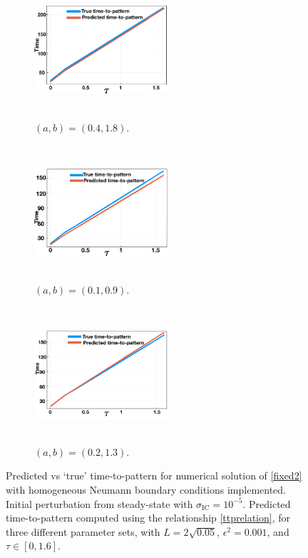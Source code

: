 \begin{figure}[H]
    \centering
    \begin{subfigure}[b]{0.32\textwidth}
        \centering
        \includegraphics[width=5cm,height=5cm]{ttp1.png}
        \caption{$(a,b)=(0.4,1.8)$.}
        \label{fig:ttp1}
    \end{subfigure}
    \hfill
    \begin{subfigure}[b]{0.32\textwidth}
        \centering
        \includegraphics[width=5cm,height=5cm]{ttp2.png}
        \caption{$(a,b)=(0.1,0.9)$.}
        \label{fig:ttp2}
    \end{subfigure}
    \hfill
    \begin{subfigure}[b]{0.32\textwidth}
        \centering
        \includegraphics[width=5cm,height=5cm]{ttp3.png}
        \caption{$(a,b)=(0.2,1.3)$.}
        \label{fig:ttp3}
    \end{subfigure}
    \caption{Predicted vs `true' time-to-pattern for numerical solution of \eqref{fixed2} with homogeneous Neumann boundary conditions implemented. Initial perturbation from steady-state with $\sigma_{\text{IC}}= 10^{-5}$. Predicted time-to-pattern computed using the relationship \eqref{ttprelation}, for three different parameter sets, with $L=2\sqrt{0.05}$, $\epsilon^2=0.001$, and $\tau\in[0,1.6]$.}
    \label{}
\end{figure}

